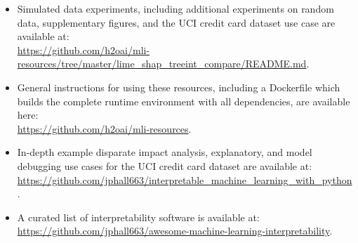 \documentclass[sigconf, review]{acmart}
\begin{document}
\begin{itemize}

	\item Simulated data experiments, including additional experiments on random data, supplementary figures, and the UCI credit card dataset use case are available at:\\
	
		\url{https://github.com/h2oai/mli-resources/tree/master/lime_shap_treeint_compare/README.md}.\\ 
	      
	\item General instructions for using these resources, including a Dockerfile which builds the complete runtime environment with all dependencies, are available here:\\
	      
		\url{https://github.com/h2oai/mli-resources}.\\

	\item In-depth example disparate impact analysis, explanatory, and model debugging use cases for the UCI credit card dataset are available at:\\ 
	
		\url{https://github.com/jphall663/interpretable_machine_learning_with_python}.\\

	\item A curated list of interpretability software is available at:\\
	
		 \url{https://github.com/jphall663/awesome-machine-learning-interpretability}.

\end{itemize}
\end{document}
